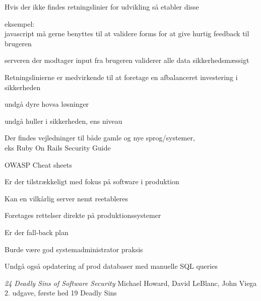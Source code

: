 \documentclass[20pt,landscape,a4paper,footrule]{foils}
\begin{document}
\begin{list2}
\item Hvis der ikke findes retningslinier for udvikling så etabler disse
\item eksempel:\\
javascript må gerne benyttes til at validere forms for at give hurtig
feedback til brugeren
\item serveren der modtager input fra brugeren validerer alle data
  sikkerhedsmæssigt
\item Retningslinierne er medvirkende til at foretage
en afbalanceret investering i sikkerheden
\item undgå dyre hovsa løsninger
\item undgå huller i sikkerheden, ens niveau

\item Der findes vejledninger til både gamle og nye sprog/systemer, \\
eks Ruby On Rails Security Guide\\

\item OWASP Cheat sheets\\
\end{list2}




\begin{list1}
\item Er der tilstrækkeligt med fokus på software i produktion
\item Kan en vilkårlig server nemt reetableres
\item Foretages rettelser direkte på produktionssystemer
\item Er der fall-back plan
\item Burde være god systemadministrator praksis
\vskip 2cm
\item Undgå også opdatering af prod databaser med manuelle SQL queries
\end{list1}



\begin{list1}
\item \emph{24 Deadly Sins of Software Security}
Michael Howard, David LeBlanc, John Viega 2. udgave, første hed 19 Deadly Sins
\end{list1}
\end{document}
